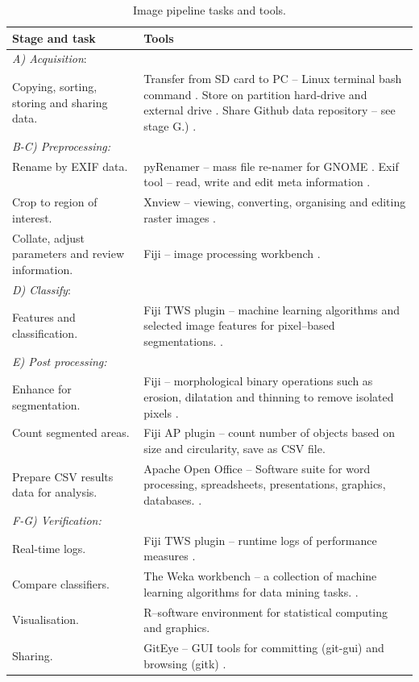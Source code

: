 \begin{table}[!htbp]\myfloatalign \caption[Image pipeline tasks and tools.]{Image pipeline tasks and tools.}\label{tab:imagea_tasktools} 
\begin{tabular}{p{1.2in}p{3.1in}}\toprule
Stage and task & Tools \\  \midrule
\emph{A) Acquisition}: & \\
Copying, sorting, storing and sharing data.\
& Transfer from \acs{SD} card to \acs{PC} -- Linux terminal bash command \cite{Matthew2011}. Store on partition hard-drive and external drive \cite{Matthew2011}. Share Github data repository -- see stage G.) \cite{Github2012, NZbees}.\\ 
\emph{B-C) Preprocessing:}& \\
Rename by \acs{EXIF} data. \
& pyRenamer -- mass file re-namer for GNOME \cite{Pyrenamer2015}. Exif tool -- read, write and edit meta information \cite{Exiftool2013}.\\
Crop to region of interest.\
& Xnview -- viewing, converting, organising and editing raster images \cite{Xnview2013}.\\
Collate, adjust parameters and review information. \
& Fiji -- image processing workbench \cite{Schindelin2012}.\\
\emph{D) Classify}: & \\
Features and classification. \
& Fiji \acs{TWS} plugin -- machine learning algorithms and selected image features for pixel--based segmentations. \cite{Schindelin2012}.\\ 
\emph{E) Post processing:} & \\
Enhance for segmentation. \ & Fiji -- morphological binary operations such as erosion, dilatation and thinning to remove isolated pixels \cite{Schindelin2012}. \\
Count segmented areas. \ & Fiji \acs{AP} plugin -- count number of objects based on size and circularity, save as \acs{CSV} file.\\ 
Prepare CSV results data for analysis. \
& Apache Open Office -- Software suite for word processing, spreadsheets, presentations, graphics, databases. \cite{AOO2015}. \\
\emph{F-G) Verification:} & \\
Real-time logs. \ 
& Fiji \acs{TWS} plugin -- runtime logs of performance measures \cite{Schindelin2012}. \\
Compare classifiers.\
& The \acs{Weka} workbench -- a collection of machine learning algorithms for data mining tasks. \cite{Hall2009,Sanchez2011}.\\
Visualisation. \
& R--software environment for statistical computing and graphics.\cite{Hothorn2014}\\
Sharing. \ & GitEye -- \acs{GUI} tools for committing (git-gui) and browsing (gitk) \cite{SmartGit2013}.
\\ \bottomrule
\end{tabular}
\end{table}

